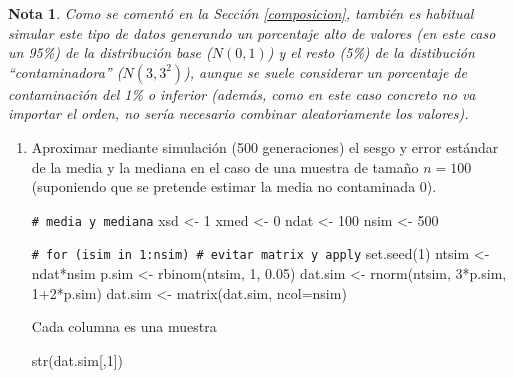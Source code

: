 \documentclass[
]{book}
\newenvironment{Shaded}{\begin{snugshade}}{\end{snugshade}}
\newcommand{\AttributeTok}[1]{\textcolor[rgb]{0.77,0.63,0.00}{#1}}
\newcommand{\CommentTok}[1]{\textcolor[rgb]{0.56,0.35,0.01}{\textit{#1}}}
\newcommand{\DecValTok}[1]{\textcolor[rgb]{0.00,0.00,0.81}{#1}}
\newcommand{\FloatTok}[1]{\textcolor[rgb]{0.00,0.00,0.81}{#1}}
\newcommand{\FunctionTok}[1]{\textcolor[rgb]{0.00,0.00,0.00}{#1}}
\newcommand{\NormalTok}[1]{#1}
\newcommand{\OtherTok}[1]{\textcolor[rgb]{0.56,0.35,0.01}{#1}}
\newcommand{\SpecialCharTok}[1]{\textcolor[rgb]{0.00,0.00,0.00}{#1}}
\theoremstyle{break}
\theoremstyle{nonumberplain}
\newtheorem{remark}{Nota}
\renewcommand{\CommentTok}[1]{\textcolor[rgb]{0.41,0.41,0.41}{\texttt{#1}}}
\begin{document}
\begin{remark}
Como se comentó en la Sección \ref{composicion}, también es habitual simular este tipo de datos generando un porcentaje alto de valores (en este caso un 95\%) de la distribución base (\(N(0,1)\)) y el resto (5\%) de la distibución ``contaminadora'' (\(N(3,3^2)\)), aunque se suele considerar un porcentaje de contaminación del 1\% o inferior (además, como en este caso concreto no va importar el orden, no sería necesario combinar aleatoriamente los valores).
\end{remark}

\vspace{0.5cm}

\begin{enumerate}
\def\labelenumi{\alph{enumi})}
\item
  Aproximar mediante simulación (500 generaciones) el sesgo y
  error estándar de la media y la mediana en el caso de una
  muestra de tamaño \(n=100\) (suponiendo que se pretende estimar la
  media no contaminada 0).

\begin{Shaded}
\begin{Highlighting}[]
\CommentTok{\# media y mediana}
\NormalTok{xsd }\OtherTok{\textless{}{-}} \DecValTok{1}
\NormalTok{xmed }\OtherTok{\textless{}{-}} \DecValTok{0}
\NormalTok{ndat }\OtherTok{\textless{}{-}} \DecValTok{100}
\NormalTok{nsim }\OtherTok{\textless{}{-}} \DecValTok{500}

\CommentTok{\# for (isim in 1:nsim) \# evitar matrix y apply}
\FunctionTok{set.seed}\NormalTok{(}\DecValTok{1}\NormalTok{)}
\NormalTok{ntsim }\OtherTok{\textless{}{-}}\NormalTok{ ndat}\SpecialCharTok{*}\NormalTok{nsim}
\NormalTok{p.sim }\OtherTok{\textless{}{-}} \FunctionTok{rbinom}\NormalTok{(ntsim, }\DecValTok{1}\NormalTok{, }\FloatTok{0.05}\NormalTok{)}
\NormalTok{dat.sim }\OtherTok{\textless{}{-}} \FunctionTok{rnorm}\NormalTok{(ntsim, }\DecValTok{3}\SpecialCharTok{*}\NormalTok{p.sim, }\DecValTok{1}\SpecialCharTok{+}\DecValTok{2}\SpecialCharTok{*}\NormalTok{p.sim)}
\NormalTok{dat.sim }\OtherTok{\textless{}{-}} \FunctionTok{matrix}\NormalTok{(dat.sim, }\AttributeTok{ncol=}\NormalTok{nsim)}
\end{Highlighting}
\end{Shaded}

  Cada columna es una muestra

\begin{Shaded}
\begin{Highlighting}[]
\FunctionTok{str}\NormalTok{(dat.sim[,}\DecValTok{1}\NormalTok{])}
\end{Highlighting}
\end{Shaded}


\end{enumerate}
\end{document}
